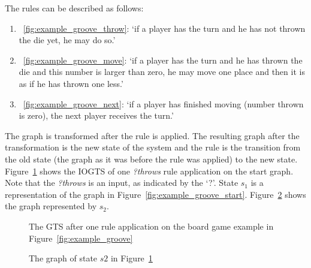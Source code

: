 The rules can be described as follows:
\begin{enumerate}
  \item~\ref{fig:example_groove_throw}: `if a player has the turn and he has not thrown the die yet, he may do so.'
  \item~\ref{fig:example_groove_move}: `if a player has the turn and he has thrown the die and this number is larger than zero, he may move one place and then it is as if he has thrown one less.'
  \item~\ref{fig:example_groove_next}: `if a player has finished moving (number thrown is zero), the next player receives the turn.'
\end{enumerate}

The graph is transformed after the rule is applied. The resulting graph after the transformation is the new state of the system and the rule is the transition from the old state (the graph as it was before the rule was applied) to the new state. Figure~\ref{fig:gts_example} shows the IOGTS of one \textit{?throws} rule application on the start graph. Note that the \textit{?throws} is an input, as indicated by the `?'. State $s_1$ is a representation of the graph in Figure~\ref{fig:example_groove_start}. Figure~\ref{fig:target_graph_state} shows the graph represented by $s_2$.

\begin{figure}[h]
  \begin{center}
    
  \end{center}
  \caption{The GTS after one rule application on the board game example in Figure~\ref{fig:example_groove}}
  \label{fig:gts_example}
\end{figure}

\begin{figure}[h]
  \begin{center}
    
  \end{center}
  \caption{The graph of state $s2$ in Figure~\ref{fig:gts_example}}
  \label{fig:target_graph_state}
\end{figure}